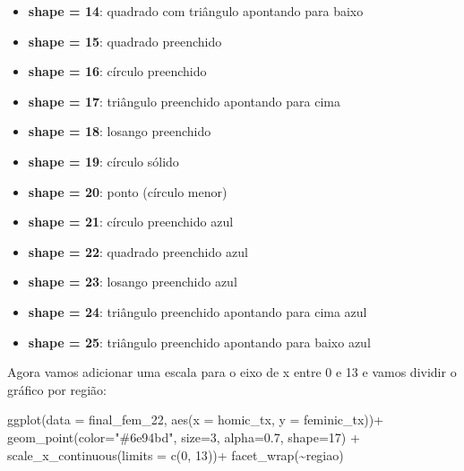 \documentclass[
  letterpaper,
  DIV=11,
  numbers=noendperiod]{scrreprt}
\newenvironment{Shaded}{\begin{snugshade}}{\end{snugshade}}
\newcommand{\AttributeTok}[1]{\textcolor[rgb]{0.40,0.45,0.13}{#1}}
\newcommand{\DecValTok}[1]{\textcolor[rgb]{0.68,0.00,0.00}{#1}}
\newcommand{\FloatTok}[1]{\textcolor[rgb]{0.68,0.00,0.00}{#1}}
\newcommand{\FunctionTok}[1]{\textcolor[rgb]{0.28,0.35,0.67}{#1}}
\newcommand{\NormalTok}[1]{\textcolor[rgb]{0.00,0.23,0.31}{#1}}
\newcommand{\SpecialCharTok}[1]{\textcolor[rgb]{0.37,0.37,0.37}{#1}}
\newcommand{\StringTok}[1]{\textcolor[rgb]{0.13,0.47,0.30}{#1}}
\begin{document}
\begin{tcolorbox}[enhanced jigsaw, bottomrule=.15mm, leftrule=.75mm, arc=.35mm, colframe=quarto-callout-note-color-frame, breakable, opacityback=0, toprule=.15mm, colback=white, left=2mm, rightrule=.15mm]
\begin{minipage}[t]{\textwidth - 5.5mm}
\begin{itemize}
\item
  \textbf{shape = 14}: quadrado com triângulo apontando para baixo\\
\item
  \textbf{shape = 15}: quadrado preenchido\\
\item
  \textbf{shape = 16}: círculo preenchido\\
\item
  \textbf{shape = 17}: triângulo preenchido apontando para cima\\
\item
  \textbf{shape = 18}: losango preenchido\\
\item
  \textbf{shape = 19}: círculo sólido\\
\item
  \textbf{shape = 20}: ponto (círculo menor)\\
\item
  \textbf{shape = 21}: círculo preenchido azul\\
\item
  \textbf{shape = 22}: quadrado preenchido azul\\
\item
  \textbf{shape = 23}: losango preenchido azul\\
\item
  \textbf{shape = 24}: triângulo preenchido apontando para cima azul\\
\item
  \textbf{shape = 25}: triângulo preenchido apontando para baixo azul
\end{itemize}

\end{minipage}%
\end{tcolorbox}

Agora vamos adicionar uma escala para o eixo de x entre 0 e 13 e vamos
dividir o gráfico por região:

\begin{Shaded}
\begin{Highlighting}[]
\FunctionTok{ggplot}\NormalTok{(}\AttributeTok{data =}\NormalTok{ final\_fem\_22, }\FunctionTok{aes}\NormalTok{(}\AttributeTok{x =}\NormalTok{ homic\_tx, }\AttributeTok{y =}\NormalTok{ feminic\_tx))}\SpecialCharTok{+}
  \FunctionTok{geom\_point}\NormalTok{(}\AttributeTok{color=}\StringTok{"\#6e94bd"}\NormalTok{, }\AttributeTok{size=}\DecValTok{3}\NormalTok{, }\AttributeTok{alpha=}\FloatTok{0.7}\NormalTok{,  }\AttributeTok{shape=}\DecValTok{17}\NormalTok{) }\SpecialCharTok{+}
  \FunctionTok{scale\_x\_continuous}\NormalTok{(}\AttributeTok{limits =} \FunctionTok{c}\NormalTok{(}\DecValTok{0}\NormalTok{, }\DecValTok{13}\NormalTok{))}\SpecialCharTok{+}
  \FunctionTok{facet\_wrap}\NormalTok{(}\SpecialCharTok{\textasciitilde{}}\NormalTok{regiao)}
\end{Highlighting}
\end{Shaded}
\end{document}
